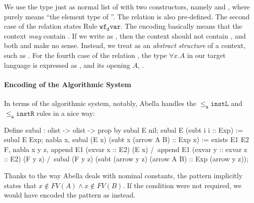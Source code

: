 We use the type  just as normal list of  with two constructors, namely  and , where  purely means ``the element type of ''. The  relation is also pre-defined.
The second case of the relation  states Rule $\mathtt{wf_d var}$.
The encoding  basically means that the context \emph{may} contain .
If we write  as , then the context should not contain , and both  and  make no sense.
Instead, we treat  as an \emph{abstract structure} of a context, such as .
For the fourth case of the relation , the type $\forall x. A$ in our target language is expressed as , and its opening $A$, .

\paragraph{Encoding of the Algorithmic System}
In terms of the algorithmic system, notably, Abella handles the
$\mathtt{{\le_a}instL}$ and $\mathtt{{\le_a}instR}$ rules in a nice way:
\begin{abella}
	Define subal : olist -> olist -> prop by
		subal E nil;
		subal E (subt i i :: Exp) := subal E Exp;
		nabla x, subal (E x) (subt x (arrow A B) :: Exp x) :=
			exists E1 E2 F, nabla x y z, append E1 (exvar x :: E2) (E x) /\
				append E1 (exvar y :: exvar z :: E2) (F y z) /\
				subal (F y z) (subt (arrow y z) (arrow A B) :: Exp (arrow y z));
\end{abella}
Thanks to the way Abella deals with nominal constants, the pattern 
 implicitly states that $x\notin FV(A) \land x\notin FV(B)$.
If the condition were not required, we would have encoded the pattern as 
\abellae{subt x (arrow (A x) (B x))} instead.

